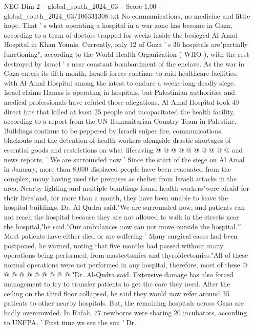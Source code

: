 \begin{textsample}{NEG Dim 2 – global\_south\_2024\_03 – Score 1.00 – global\_south\_2024\_03/106331308.txt}  \label{ex:f2_neg_105}
No communications, no medicine and little hope.
That ' s what operating a hospital in a war zone has become in Gaza, according to a team of doctors trapped for weeks inside the besieged Al Amal Hospital in Khan Younis.
Currently, only 12 of Gaza ' s 36 hospitals are"partially functioning", according to the World Health Organization ( WHO ), with the rest destroyed by Israel ' s near constant bombardment of the enclave.
As the war in Gaza enters its fifth month, Israeli forces continue to raid healthcare facilities, with Al Amal Hospital among the latest to endure a weeks-long deadly siege.
Israel claims Hamas is operating in hospitals, but Palestinian authorities and medical professionals have refuted those allegations.
Al Amal Hospital took 40 direct hits that killed at least 25 people and incapacitated the health facility, according to a report from the UN Humanitarian Country Team in Palestine.
Buildings continue to be peppered by Israeli sniper fire, communications blackouts and the detention of health workers alongside drastic shortages of essential goods and restrictions on what lifesaving @ @ @ @ @ @ @ @ @ @ and news reports. ' We are surrounded now ' Since the start of the siege on Al Amal in January, more than 8,000 displaced people have been evacuated from the complex, many having used the premises as shelter from Israeli attacks in the area.
Nearby fighting and multiple bombings found health workers"were afraid for their lives"and, for more than a month, they have been unable to leave the hospital buildings, Dr.
Al-Qudra said."We are surrounded now, and patients can not reach the hospital because they are not allowed to walk in the streets near the hospital,"he said."Our ambulances now can not move outside the hospital."' Most patients have either died or are suffering ' Many surgical cases had been postponed, he warned, noting that five months had passed without many operations being performed, from mastectomies and thyroidectomies."All of these normal operations were not performed in any hospital, therefore, most of these @ @ @ @ @ @ @ @ @ @,"Dr.
Al-Qudra said.
Extensive damage has also forced management to try to transfer patients to get the care they need.
After the ceiling on the third floor collapsed, he said they would now refer around 35 patients to other nearby hospitals.
But, the remaining hospitals across Gaza are badly overcrowded.
In Rafah, 77 newborns were sharing 20 incubators, according to UNFPA. ' First time we see the sun ' Dr.

\end{textsample}

